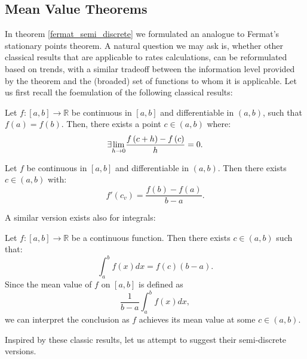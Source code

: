 \documentclass[11pt]{book}
\begin{document}
\subsection{Mean Value Theorems}

In theorem \ref{fermat_semi_discrete} we formulated an analogue to Fermat's stationary points theorem. A natural question we may ask is, whether other classical results that are applicable to rates calculations, can be reformulated based on trends, with a similar tradeoff between the information level provided by the theorem and the (broaded) set of functions to whom it is applicable. Let us first recall the foemulation of the following classical results:

\begin{theorem}Let $f:\left[a,b\right]\rightarrow\mathbb{R}$ be continuous in $\left[a,b\right]$ and differentiable in $\left(a,b\right)$, such that $f\left(a\right)=f\left(b\right).$ Then, there exists a point $c\in\left(a,b\right)$ where:
$$\exists \underset{h\rightarrow0}{\lim}{{f\left(c+h\right)-f\left(c\right)}\over{h}}=0.$$
\label{rolle_theorem}
\end{theorem}

\begin{theorem}Let $f$ be continuous in $\left[a,b\right]$ and differentiable in $\left(a,b\right)$. Then there exists $c\in \left(a,b\right)$ with:
$$f'\left(c_{v}\right)=\frac{f\left(b\right)-f\left(a\right)}{b-a}.$$
\label{mvt_derivative_thm}
\end{theorem}

A similar version exists also for integrals:

\begin{theorem}Let $f:\left[a,b\right]\rightarrow\mathbb{R}$ be a continuous
function. Then there exists $c\in\left(a,b\right)$ such that:
\[
\int_{a}^{b}f\left(x\right)dx=f\left(c\right)\left(b-a\right).
\]
Since the mean value of $f$ on $\left[a,b\right]$ is defined as
\[
\frac{1}{b-a}\int_{a}^{b}f\left(x\right)dx,
\]
we can interpret the conclusion as $f$ achieves its mean value at
some $c\in\left(a,b\right)$.
\label{mvt_integral_thm}
\end{theorem}

Inspired by these classic results, let us attempt to suggest their semi-discrete versions.
 
\end{document}
